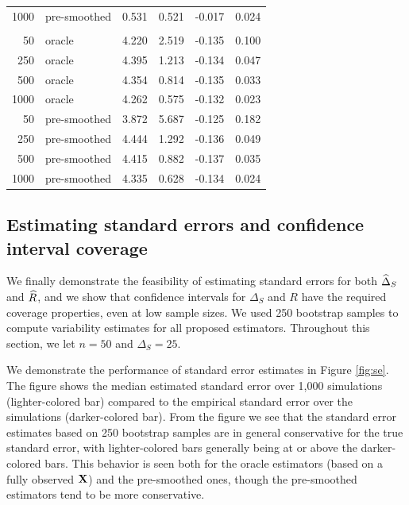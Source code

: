 \documentclass[useAMS,usenatbib,referee]{biom}
\begin{document}
\begin{table}[t]
\begin{tabular}{rlrrrr}
\hspace{1em}1000 & pre-smoothed & 0.531 & 0.521 & -0.017 & 0.024\\
\addlinespace[0.3em]
\multicolumn{6}{l}{\textbf{Linear-unsmoothed}}\\
\hspace{1em}50 & oracle & 4.220 & 2.519 & -0.135 & 0.100\\
\hspace{1em}250 & oracle & 4.395 & 1.213 & -0.134 & 0.047\\
\hspace{1em}500 & oracle & 4.354 & 0.814 & -0.135 & 0.033\\
\hspace{1em}1000 & oracle & 4.262 & 0.575 & -0.132 & 0.023\\
\hspace{1em}50 & pre-smoothed & 3.872 & 5.687 & -0.125 & 0.182\\
\hspace{1em}250 & pre-smoothed & 4.444 & 1.292 & -0.136 & 0.049\\
\hspace{1em}500 & pre-smoothed & 4.415 & 0.882 & -0.137 & 0.035\\
\hspace{1em}1000 & pre-smoothed & 4.335 & 0.628 & -0.134 & 0.024\\
\bottomrule
\end{tabular}
\end{table}

\subsection{Estimating standard errors and confidence interval coverage}

We finally demonstrate the feasibility of estimating standard errors for both ${\widehat\Delta}_S$ and ${\widehat R}$, and we show that confidence intervals for $\Delta_S$ and $R$ have the required coverage properties, even at low sample sizes. We used 250 bootstrap samples to compute variability estimates for all proposed estimators. Throughout this section, we let $n = 50$ and $\Delta_S = 25$. 

We demonstrate the performance of standard error estimates in Figure \ref{fig:se}. The figure shows the median estimated standard error over 1,000 simulations (lighter-colored bar) compared to the empirical standard error over the simulations (darker-colored bar). From the figure we see that the standard error estimates based on 250 bootstrap samples are in general conservative for the true standard error, with lighter-colored bars generally being at or above the darker-colored bars. This behavior is seen both for the oracle estimators (based on a fully observed ${\bf X}$) and the pre-smoothed ones, though the pre-smoothed estimators tend to be more conservative. 
\end{document}

